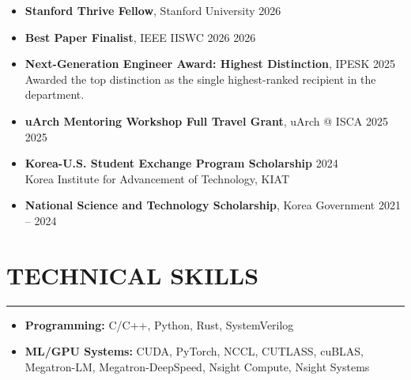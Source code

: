 \documentclass[11pt, a4paper]{article}
\newcommand{\resumesection}[1]{
    \vspace{-0.35cm}
    \section*{#1}
    \vspace{-0.25cm}
    \hrule\vspace{0.2cm}
}
\begin{document}
\begin{itemize}[leftmargin=1.2em]
    \item \textbf{Stanford Thrive Fellow}, Stanford University
    \hfill 2026

    \vspace{0.03cm}

    \item \textbf{Best Paper Finalist}, IEEE IISWC 2026
    \hfill 2026

    \vspace{0.03cm}

    \item \textbf{Next-Generation Engineer Award: Highest Distinction}, IPESK
    \hfill 2025\\
    Awarded the top distinction as the single highest-ranked recipient in the department.

    \vspace{0.03cm}

    \item \textbf{uArch Mentoring Workshop Full Travel Grant}, uArch @ ISCA 2025
    \hfill 2025

    \vspace{0.03cm}

    \item \textbf{Korea-U.S. Student Exchange Program Scholarship}
    \hfill 2024\\
    Korea Institute for Advancement of Technology, KIAT

    \vspace{0.03cm}

    \item \textbf{National Science and Technology Scholarship}, Korea Government
    \hfill 2021 -- 2024
\end{itemize}

\resumesection{TECHNICAL SKILLS}

\begin{itemize}[leftmargin=1.2em]
    \item \textbf{Programming:} C/C++, Python, Rust, SystemVerilog

    \vspace{0.05cm}

    \item \textbf{ML/GPU Systems:} CUDA, PyTorch, NCCL, CUTLASS, cuBLAS, Megatron-LM, Megatron-DeepSpeed, Nsight Compute, Nsight Systems
\end{itemize}

\end{document}
